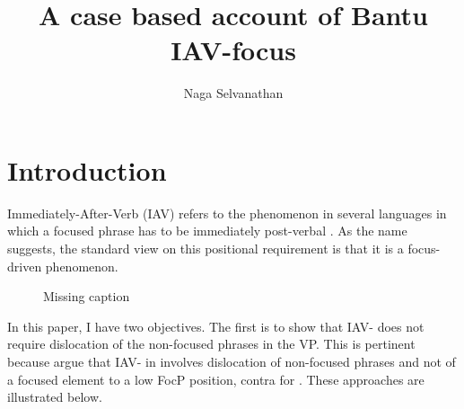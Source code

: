 \documentclass[output=paper
,newtxmath
,modfonts
,nonflat]{langsci/langscibook}
\title{A case based account of Bantu IAV-focus}
\author{
Naga Selvanathan\affiliation{Rutgers University}
}
\begin{document}
\maketitle
\section{Introduction}\label{sec:selvanathan:1}

 Immediately-After-Verb (IAV)  refers to the phenomenon in several  languages in which a focused phrase has to be immediately post-verbal \citep{hyman1979nounstructure,watters1979}. As the name suggests, the standard view on this positional requirement is that it is a focus-driven phenomenon. 

\begin{figure}
%
%
\caption{\color{red}Missing caption}
\label{fig:selvanathan:1}
\end{figure}


In this paper, I have two objectives. The first is to show that  IAV- does not require dislocation of the non-focused phrases in the VP. This is pertinent because \citet{chengdowning2012} argue that IAV- in  involves dislocation of non-focused phrases and not  of a focused element to a low FocP position, contra \citet{vanderwal2006} for . These approaches are illustrated below.
\end{document}
